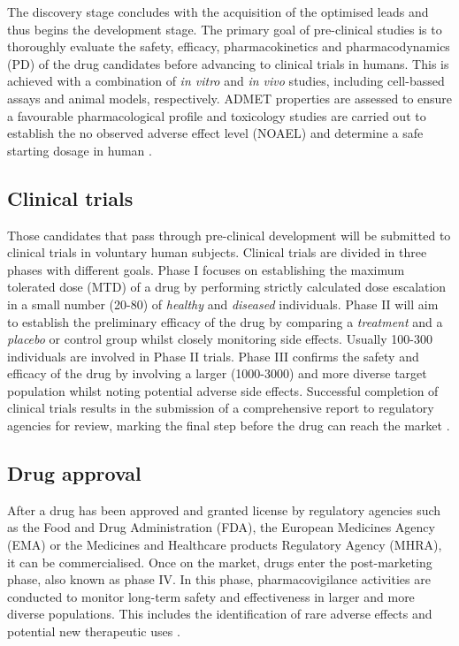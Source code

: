 The discovery stage concludes with the acquisition of the optimised leads and thus begins the development stage. The primary goal of pre-clinical studies is to thoroughly evaluate the safety, efficacy, pharmacokinetics and pharmacodynamics (PD) of the drug candidates before advancing to clinical trials in humans. This is achieved with a combination of \textit{in vitro} and \textit{in vivo} studies, including cell-bassed assays and animal models, respectively. ADMET properties are assessed to ensure a favourable pharmacological profile and toxicology studies are carried out to establish the no observed adverse effect level (NOAEL) and determine a safe starting dosage in human \cite{SHEGOKAR_2020_PRECLINICAL}.

\subsection{Clinical trials}

Those candidates that pass through pre-clinical development will be submitted to clinical trials in voluntary human subjects. Clinical trials are divided in three phases with different goals. Phase I focuses on establishing the maximum tolerated dose (MTD) of a drug by performing strictly calculated dose escalation in a small number (20-80) of \textit{healthy} and \textit{diseased} individuals. Phase II will aim to establish the preliminary efficacy of the drug by comparing a \textit{treatment} and a \textit{placebo} or control group whilst closely monitoring side effects. Usually 100-300 individuals are involved in Phase II trials. Phase III confirms the safety and efficacy of the drug by involving a larger (1000-3000) and more diverse target population whilst noting potential adverse side effects. Successful completion of clinical trials results in the submission of a comprehensive report to regulatory agencies for review, marking the final step before the drug can reach the market \cite{UMSCHEID_2011_TRIALS}.

\subsection{Drug approval}

After a drug has been approved and granted license by regulatory agencies such as the Food and Drug Administration (FDA), the European Medicines Agency (EMA) or the Medicines and Healthcare products Regulatory Agency (MHRA), it can be commercialised. Once on the market, drugs enter the post-marketing phase, also known as phase IV. In this phase, pharmacovigilance activities are conducted to monitor long-term safety and effectiveness in larger and more diverse populations. This includes the identification of rare adverse effects and potential new therapeutic uses \cite{SUVARNA_2010_PHASE4}.

